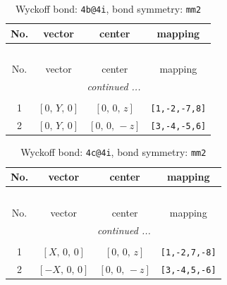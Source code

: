 \documentclass[fleqn,8pt]{jsarticle}
\begin{document}
\renewcommand{\arraystretch}{1.2}
\begin{longtable}{cccc}
\caption{Wyckoff bond: {\tt 4b@4i}, bond symmetry: {\tt mm2}}
 \\
 \hline \hline
No. & vector & center & mapping \\ \hline \endfirsthead

\multicolumn{3}{l}{\tablename\ \thetable{}} \\
 \hline \hline
No. & vector & center & mapping \\ \hline \endhead

 \hline \hline
\multicolumn{3}{r}{\footnotesize\it continued ...} \\ \endfoot

 \hline \hline
\multicolumn{3}{r}{} \\ \endlastfoot

1 & $\left[ 0,\, Y,\, 0 \right]$ & $\left[ 0,\, 0,\, z \right]$ & {\tt [1,-2,-7,8]} \\ \hline
2 & $\left[ 0,\, Y,\, 0 \right]$ & $\left[ 0,\, 0,\, - z \right]$ & {\tt [3,-4,-5,6]} \\
\end{longtable}
\renewcommand{\arraystretch}{1.2}
\begin{longtable}{cccc}
\caption{Wyckoff bond: {\tt 4c@4i}, bond symmetry: {\tt mm2}}
 \\
 \hline \hline
No. & vector & center & mapping \\ \hline \endfirsthead

\multicolumn{3}{l}{\tablename\ \thetable{}} \\
 \hline \hline
No. & vector & center & mapping \\ \hline \endhead

 \hline \hline
\multicolumn{3}{r}{\footnotesize\it continued ...} \\ \endfoot

 \hline \hline
\multicolumn{3}{r}{} \\ \endlastfoot

1 & $\left[ X,\, 0,\, 0 \right]$ & $\left[ 0,\, 0,\, z \right]$ & {\tt [1,-2,7,-8]} \\ \hline
2 & $\left[ - X,\, 0,\, 0 \right]$ & $\left[ 0,\, 0,\, - z \right]$ & {\tt [3,-4,5,-6]} \\
\end{longtable}
\renewcommand{\arraystretch}{1.2}
\end{document}
